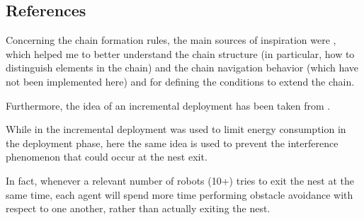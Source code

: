\subsection{References}

Concerning the chain formation rules, the main sources of inspiration were \cite{nouyan2004chain}, \cite{nouyan2008path} which helped me to better understand the chain structure (in particular, how to distinguish elements in the chain) and the chain navigation behavior (which have not been implemented here) and \cite{goss1992harvesting} for defining the conditions to extend the chain.

Furthermore, the idea of an incremental deployment has been taken from \cite{stirling2013energy}.

While in \cite{stirling2013energy} the incremental deployment was used to limit energy consumption in the deployment phase, here the same idea is used to prevent the interference phenomenon that could occur at the nest exit.

In fact, whenever a relevant number of robots (10+) tries to exit the nest at the same time, each agent will spend more time performing obstacle avoidance with respect to one another, rather than actually exiting the nest.






